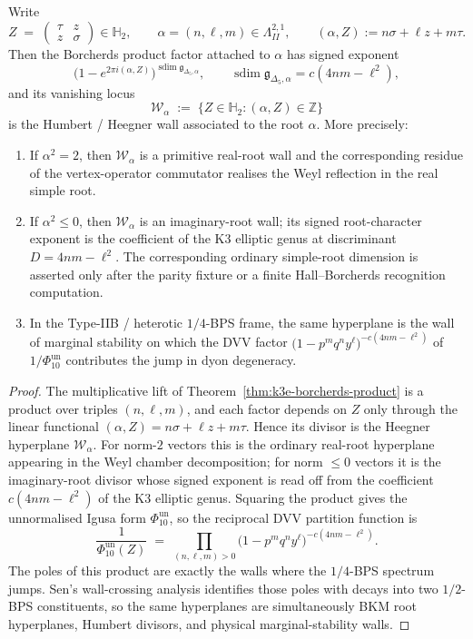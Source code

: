 \begin{theorem}
\label{thm:k3e-root-hyperplanes-walls}
Write
\[
 Z
 \;=\;
 \begin{pmatrix}
 \tau & z \\
 z & \sigma
 \end{pmatrix}
 \in \mathbb{H}_2,
 \qquad
 \alpha=(n,\ell,m)\in \Lambda^{2,1}_{II},
 \qquad
 (\alpha,Z):=n\sigma+\ell z+m\tau.
\]
Then the Borcherds product factor attached to $\alpha$ has signed exponent
\[
 \bigl(1-e^{2\pi i(\alpha,Z)}\bigr)^{\operatorname{sdim}\mathfrak g_{\Delta_5,\alpha}},
 \qquad
 \operatorname{sdim}\mathfrak g_{\Delta_5,\alpha}=c(4nm-\ell^2),
\]
and its vanishing locus
\[
 \mathcal{W}_\alpha
 \;:=\;
 \{Z\in\mathbb{H}_2 : (\alpha,Z)\in\mathbb{Z}\}
\]
is the Humbert / Heegner wall associated to the root $\alpha$.
More precisely:
\begin{enumerate}[label=\textup{(\roman*)}]
\item If $\alpha^2 = 2$, then $\mathcal{W}_\alpha$ is a primitive real-root wall and the
 corresponding residue of the vertex-operator commutator realises the Weyl reflection
 in the real simple root.
\item If $\alpha^2 \leq 0$, then $\mathcal{W}_\alpha$ is an imaginary-root wall; its
 signed root-character exponent is the coefficient of the K3 elliptic genus at
 discriminant $D = 4nm-\ell^2$. The corresponding ordinary simple-root
 dimension is asserted only after the parity fixture or a finite Hall--Borcherds
 recognition computation.
\item In the Type-IIB / heterotic $1/4$-BPS frame, the same hyperplane is the wall of
 marginal stability on which the DVV factor
 $\bigl(1-p^m q^n y^\ell\bigr)^{-c(4nm-\ell^2)}$ of
 \(1/\Phi_{10}^{\mathrm{un}}\) contributes the jump in dyon degeneracy.
\end{enumerate}
\end{theorem}

\begin{proof}
The multiplicative lift of Theorem~\ref{thm:k3e-borcherds-product} is a product over
triples $(n,\ell,m)$, and each factor depends on $Z$ only through the linear functional
$(\alpha,Z)=n\sigma+\ell z+m\tau$. Hence its divisor is the Heegner hyperplane
$\mathcal{W}_\alpha$. For norm-$2$ vectors this is the ordinary real-root hyperplane
appearing in the Weyl chamber decomposition; for norm $\leq 0$ vectors it is the
imaginary-root divisor whose signed exponent is read off from the coefficient
$c(4nm-\ell^2)$ of the K3 elliptic genus. Squaring the product gives the
unnormalised Igusa form \(\Phi_{10}^{\mathrm{un}}\), so the reciprocal
DVV partition function is
\[
 \frac{1}{\Phi_{10}^{\mathrm{un}}(Z)}
 \;=\;
 \prod_{(n,\ell,m)>0}
 \bigl(1-p^m q^n y^\ell\bigr)^{-c(4nm-\ell^2)}.
\]
The poles of this product are exactly the walls where the $1/4$-BPS spectrum jumps.
Sen's wall-crossing analysis identifies those poles with decays into two $1/2$-BPS
constituents, so the same hyperplanes are simultaneously BKM root hyperplanes, Humbert
divisors, and physical marginal-stability walls.
\end{proof}

